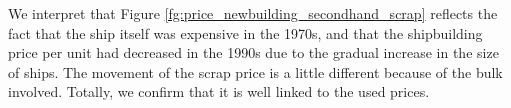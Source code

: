 
We interpret that Figure \ref{fg:price_newbuilding_secondhand_scrap} reflects the fact that the ship itself was expensive in the 1970s, and that the shipbuilding price per unit had decreased in the 1990s due to the gradual increase in the size of ships. The movement of the scrap price is a little different because of the bulk involved. Totally, we confirm that it is well linked to the used prices.